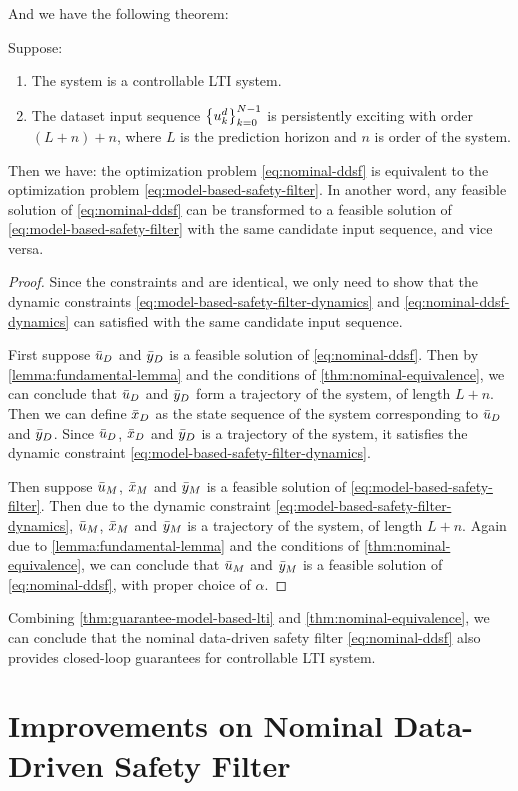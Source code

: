 And we have the following theorem:

\begin{theorem}\label{thm:nominal-equivalence}
    Suppose:
    \begin{enumerate}
        \item The system is a controllable LTI system.
        \item The dataset input sequence $\left\{u^d_k\right\}_{k=0}^{N-1}$ is persistently exciting with order $(L+n)+n$, where $L$ is the prediction horizon and $n$ is order of the system.
    \end{enumerate}
    Then we have: the optimization problem \cref{eq:nominal-ddsf} is equivalent to the optimization problem \cref{eq:model-based-safety-filter}.
    In another word, any feasible solution of \cref{eq:nominal-ddsf} can be transformed to a feasible solution of \cref{eq:model-based-safety-filter} with the same candidate input sequence, and vice versa.
\end{theorem}

\begin{proof}\label{prf:nominal-equivalence}
    Since the constraints  and  are identical, we only need to show that the dynamic constraints \cref{eq:model-based-safety-filter-dynamics} and \cref{eq:nominal-ddsf-dynamics} can satisfied with the same candidate input sequence.

    First suppose $\bar{u}_D$ and $\bar{y}_D$ is a feasible solution of \cref{eq:nominal-ddsf}.
    Then by \cref{lemma:fundamental-lemma} and the conditions of \cref{thm:nominal-equivalence}, we can conclude that $\bar{u}_D$ and $\bar{y}_D$ form a trajectory of the system, of length $L+n$.
    Then we can define $\bar{x}_D$ as the state sequence of the system corresponding to $\bar{u}_D$ and $\bar{y}_D$.
    Since $\bar{u}_D$, $\bar{x}_D$ and $\bar{y}_D$ is a trajectory of the system, it satisfies the dynamic constraint \cref{eq:model-based-safety-filter-dynamics}.

    Then suppose $\bar{u}_M$, $\bar{x}_M$ and $\bar{y}_M$ is a feasible solution of \cref{eq:model-based-safety-filter}.
    Then due to the dynamic constraint \cref{eq:model-based-safety-filter-dynamics}, $\bar{u}_M$, $\bar{x}_M$ and $\bar{y}_M$ is a trajectory of the system, of length $L+n$.
    Again due to \cref{lemma:fundamental-lemma} and the conditions of \cref{thm:nominal-equivalence}, we can conclude that $\bar{u}_M$ and $\bar{y}_M$ is a feasible solution of \cref{eq:nominal-ddsf}, with proper choice of $\alpha$.
\end{proof}

Combining \cref{thm:guarantee-model-based-lti} and \cref{thm:nominal-equivalence}, we can conclude that the nominal data-driven safety filter \cref{eq:nominal-ddsf} also provides closed-loop guarantees for controllable LTI system.

\section{Improvements on Nominal Data-Driven Safety Filter}\label{sec:improvements-nominal}
